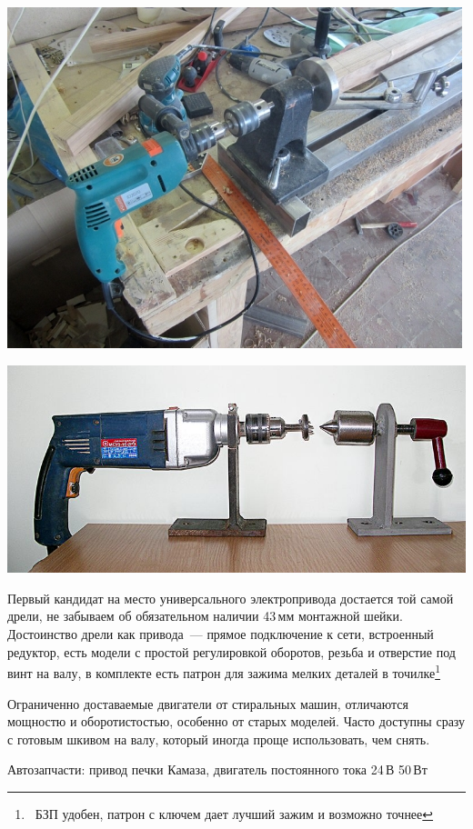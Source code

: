 {\begin{multicols}{2}
\noindent\includegraphics[width=\columnwidth]{00/fig/DrelLathe.jpg}

\noindent\includegraphics[width=\columnwidth]{00/fig/DrelLathe2.jpg}
\end{multicols}

Первый кандидат на место универсального электропривода достается той
самой дрели, не забываем об обязательном наличии 43\,мм монтажной шейки.
Достоинство дрели как привода\ --- прямое подключение к сети, встроенный
редуктор, есть модели с простой регулировкой оборотов, резьба и отверстие под
винт на валу, в комплекте есть патрон для зажима мелких деталей в
точилке\footnote{\ БЗП удобен, патрон с ключем дает лучший зажим и возможно
точнее}

Ограниченно доставаемые двигатели от стиральных машин, отличаются мощностю и
оборотистостью, особенно от старых моделей. Часто доступны сразу с готовым
шкивом на валу, который иногда проще использовать, чем снять.

\bigskip
Автозапчасти: привод печки Камаза, двигатель постоянного тока 24\,В
  50\,Вт

}
